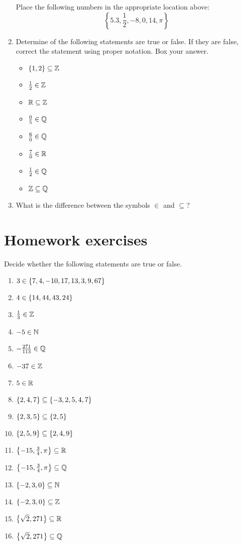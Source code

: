 \documentclass{article}
\begin{document}
\begin{enumerate}[resume]
  Place the following numbers in the appropriate location above:
  \[
    \left\{5.3,\frac12,-8,0,14,\pi\right\}
  \]
\item Determine of the following statements are true or false. If they are false, correct the statement using proper notation. Box your answer.
  \begin{itemize}
    \ispace{0.25in}
  \item \(\{1,2\} \subseteq \mathbb{Z}\)
  \item \(\frac12 \in \mathbb{Z}\)
  \item \(\mathbb{R} \subseteq \mathbb{Z}\)
  \item \(\frac05 \in \mathbb{Q}\)
  \item \(\frac60 \in \mathbb{Q}\)
  \item \(\frac70 \in \mathbb{R}\)
  \item \(\frac12 \in \mathbb{Q}\)
  \item \(\mathbb{Z} \subseteq \mathbb{Q}\)
  \end{itemize}
  \vspace{0.25in}
\item What is the difference between the symbols \(\in\) and \(\subseteq\)?
\end{enumerate}

\clearpage

\section*{Homework exercises}
Decide whether the following statements are true or false.

\Large

\begin{enumerate}
  \setlength{\itemsep}{\fill}
\item \(3\in\left\{ {7,4,-10,17,13,3,9,67} \right\}\)
\item \(4\in\left\{ {14,44,43,24} \right\}\)
\item \(\frac13\in \mathbb{Z}\)
\item \(-5\in \mathbb{N}\)
\item \(-\frac{271}{113}\in \mathbb{Q}\)
\item \(-37\in\mathbb{Z}\)
\item \(5\in\mathbb{R}\)
\item \(\left\{ {2,4,7} \right\}\subseteq \left\{ {-3,2,5,4,7} \right\}\)
\item \(\left\{ {2,3,5} \right\}\subseteq \left\{ {2,5} \right\}\)
\item \(\left\{ {2,5,9} \right\} \subseteq \left\{ {2,4,9} \right\}\)
\item \(\left\{ {-15,\frac34,\pi} \right\}\subseteq \mathbb{R}\)
\item \(\left\{ {-15,\frac34,\pi} \right\}\subseteq \mathbb{Q}\)
\item \(\left\{ {-2,3,0} \right\}\subseteq \mathbb{N}\)
\item \(\left\{ {-2,3,0} \right\} \subseteq \mathbb{Z}\)
\item \(\left\{ {\sqrt{2},271} \right\}\subseteq \mathbb{R}\)
\item \(\left\{ {\sqrt{2},271} \right\}\subseteq \mathbb{Q}\)
  \vfill
\end{enumerate}
\end{document}
